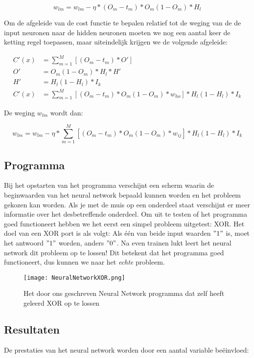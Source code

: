 $$ w_{lm} = w_{lm} - \eta *(O_{m}-t_{m}) * O_{m}(1-O_{m})*H_{l} $$

Om de afgeleide van de cost functie te bepalen relatief tot de weging van de de input neuronen naar de hidden neuronen moeten we nog een aantal keer de ketting regel toepassen, maar uiteindelijk krijgen we de volgende afgeleide:

\begin{align*}
	C'(x) &= \sum_{m=1}^{M}[(O_{m}-t_{m}) * O'] \\
	O' &= O_{m}(1-O_{m}) * H_{l} * H' \\
	H' &= H_{l}(1-H_{l})*I_{k}\\
	C'(x) &= \sum_{m=1}^{M}[(O_{m}-t_{m}) * O_{m}(1-O_{m})*w_{ho}]*H_{l}(1-H_{l})*I_{k}
\end{align*}



De weging $w_{lm}$ wordt dan:

$$ w_{lm} = w_{lm} - \eta *\sum_{m=1}^{M}[(O_{m}-t_{m}) * O_{m}(1-O_{m})*w_{ij}]*H_{l}(1-H_{l})*I_{k} $$

\subsection{Programma}
Bij het opstarten van het programma verschijnt een scherm waarin de beginwaarden van het neural network bepaald kunnen worden en het probleem gekozen kan worden. Als je met de muis op een onderdeel staat verschijnt er meer informatie over het desbetreffende onderdeel. Om uit te testen of het programma goed functioneert hebben we het eerst een simpel probleem uitgetest: XOR. Het doel van een XOR port is als volgt: Als \'e\'en van beide input waarden $"1"$ is, moet het antwoord $"1"$ worden, anders $"0"$. Na even trainen lukt leert het neural network dit probleem op te lossen! Dit betekent dat het programma goed functioneert, dus kunnen we naar het \textit{echte} probleem.

\begin{figure}[H]
  \centering
    \texttt{[image: NeuralNetworkXOR.png]}
  \caption{Het door ons geschreven Neural Network programma dat zelf heeft geleerd XOR op te lossen}
  \label{fig:NNXOR}
\end{figure}

\subsection{Resultaten}
De prestaties van het neural network worden door een aantal variable be\"einvloed:

